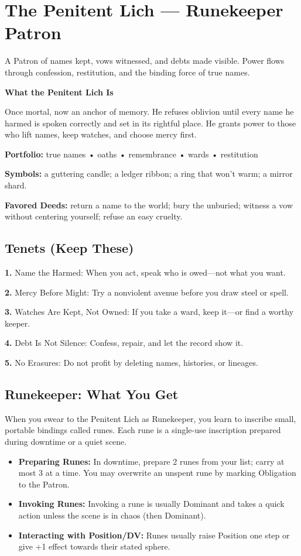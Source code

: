 \documentclass[18pt, letterpaper, twoside]{article}
\newcommand{\patrontitle}[1]{\section*{#1}}
\newcommand{\tenet}[2]{\noindent\textbf{#1.} #2\par}
\begin{document}
\patrontitle{The Penitent Lich --- Runekeeper Patron}

A Patron of names kept, vows witnessed, and debts made visible. Power flows through confession, restitution, and the binding force of true names.

\textbf{What the Penitent Lich Is}

Once mortal, now an anchor of memory. He refuses oblivion until every name he harmed is spoken correctly and set in its rightful place. He grants power to those who lift names, keep watches, and choose mercy first.

\textbf{Portfolio:} true names • oaths • remembrance • wards • restitution

\textbf{Symbols:} a guttering candle; a ledger ribbon; a ring that won't warm; a mirror shard.

\textbf{Favored Deeds:} return a name to the world; bury the unburied; witness a vow without centering yourself; refuse an easy cruelty.

\subsection{Tenets (Keep These)}
\tenet{1}{Name the Harmed: When you act, speak who is owed---not what you want.}
\tenet{2}{Mercy Before Might: Try a nonviolent avenue before you draw steel or spell.}
\tenet{3}{Watches Are Kept, Not Owned: If you take a ward, keep it---or find a worthy keeper.}
\tenet{4}{Debt Is Not Silence: Confess, repair, and let the record show it.}
\tenet{5}{No Erasures: Do not profit by deleting names, histories, or lineages.}

\subsection{Runekeeper: What You Get}

When you swear to the Penitent Lich as Runekeeper, you learn to inscribe small, portable bindings called runes. Each rune is a single-use inscription prepared during downtime or a quiet scene.
\begin{itemize}
    \item \textbf{Preparing Runes:} In downtime, prepare 2 runes from your list; carry at most 3 at a time. You may overwrite an unspent rune by marking Obligation to the Patron.
    \item \textbf{Invoking Runes:} Invoking a rune is usually Dominant and takes a quick action unless the scene is in chaos (then Dominant).
    \item \textbf{Interacting with Position/DV:} Runes usually raise Position one step or give +1 effect towards their stated sphere.
\end{itemize}
\end{document}
